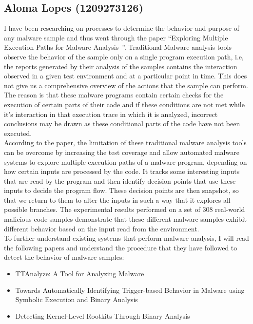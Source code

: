 \documentclass[16pt]{article}
\begin{document}
		\subsection{Aloma Lopes (1209273126)}
		I have been researching on processes to determine the behavior and purpose of any malware sample and thus went through the paper “Exploring Multiple Execution Paths for Malware Analysis~\cite{moser2007exploring}”. Traditional Malware analysis tools observe the behavior of the sample only on a single program execution path, i.e, the reports generated by their analysis of the samples contains the interaction observed in a given test environment and at a particular point in time. This does not give us a comprehensive overview of the actions that the sample can perform. The reason is that these malware programs contain certain checks for the execution of certain parts of their code and if these conditions are not met while it’s interaction in that execution trace in which it is analyzed, incorrect conclusions may be drawn as these conditional parts of the code have not been executed.\\
		According to the paper, the limitation of these traditional malware analysis tools can be overcome by increasing the test coverage and allow automated malware systems to explore multiple execution paths of a malware program, depending on how certain inputs are processed by the code. It tracks some interesting inputs that are read by the program and then identify decision points that use these inputs to decide the program flow. These decision points are then snapshot, so that we return to them to alter the inputs in such a way that it explores all possible branches. The experimental results performed on a set of 308 real-world malicious code samples demonstrate that these different malware samples exhibit different behavior based on the input read from the environment.\\
		
		To further understand existing systems that perform malware analysis, I will read the following papers and understand the procedure that they have followed to detect the behavior of malware samples:
		\begin{itemize}
			\item TTAnalyze: A Tool for Analyzing Malware~\cite{bayer2006ttanalyze}
			\item Towards Automatically Identifying Trigger-based Behavior in Malware using Symbolic Execution and Binary Analysis~\cite{brumley2008automatically}
			\item Detecting Kernel-Level Rootkits Through Binary Analysis~\cite{kruegel2004detecting}
		\end{itemize}
	
\end{document}
